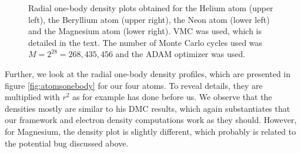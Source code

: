 \begin{figure}
	\caption{Radial one-body density plots obtained for the Helium atom (upper left), the Beryllium atom (upper right), the Neon atom (lower left) and the Magnesium atom (lower right). VMC was used, which is detailed in the text. The number of Monte Carlo cycles used was $M=2^{28}=268,435,456$ and the ADAM optimizer was used.}
	\label{fig:atomsonebody}
\end{figure}
Further, we look at the radial one-body density profiles, which are presented in figure \eqref{fig:atomsonebody} for our four atoms. To reveal details, they are multiplied with $r^2$ as for example \citet{hogberget_quantum_2013} has done before us. We observe that the densities mostly are similar to his DMC results, which again substantiates that our framework and electron density computations work as they should. However, for Magnesium, the density plot is slightly different, which probably is related to the potential bug discussed above. 
